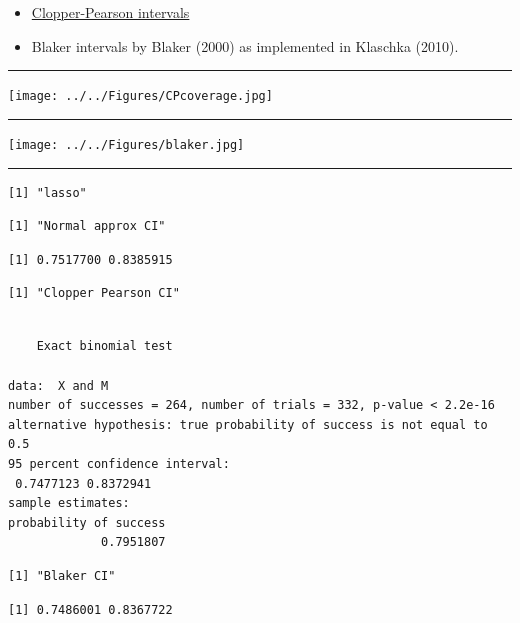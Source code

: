 \documentclass[
  letterpaper,
  DIV=11,
  numbers=noendperiod]{scrartcl}
\providecommand{\tightlist}{%
  \setlength{\itemsep}{0pt}\setlength{\parskip}{0pt}}\usepackage{longtable,booktabs,array}
\begin{document}
\begin{itemize}
\tightlist
\item
  \href{https://en.wikipedia.org/wiki/Binomial_proportion_confidence_interval}{Clopper-Pearson
  intervals}
\item
  Blaker intervals by Blaker (2000) as implemented in Klaschka (2010).
\end{itemize}

\begin{center}\rule{0.5\linewidth}{0.5pt}\end{center}

\texttt{[image: ../../Figures/CPcoverage.jpg]}

\begin{center}\rule{0.5\linewidth}{0.5pt}\end{center}

\texttt{[image: ../../Figures/blaker.jpg]}

\begin{center}\rule{0.5\linewidth}{0.5pt}\end{center}

\footnotesize

\begin{verbatim}
[1] "lasso"
\end{verbatim}

\begin{verbatim}
[1] "Normal approx CI"
\end{verbatim}

\begin{verbatim}
[1] 0.7517700 0.8385915
\end{verbatim}

\begin{verbatim}
[1] "Clopper Pearson CI"
\end{verbatim}

\begin{verbatim}

    Exact binomial test

data:  X and M
number of successes = 264, number of trials = 332, p-value < 2.2e-16
alternative hypothesis: true probability of success is not equal to 0.5
95 percent confidence interval:
 0.7477123 0.8372941
sample estimates:
probability of success 
             0.7951807 
\end{verbatim}

\begin{verbatim}
[1] "Blaker CI"
\end{verbatim}

\begin{verbatim}
[1] 0.7486001 0.8367722
\end{verbatim}
\end{document}
